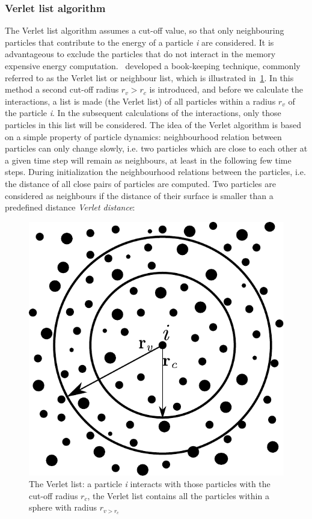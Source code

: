 \subsubsection{Verlet list algorithm}
The Verlet list algorithm assumes a cut-off value, so that only neighbouring 
particles that contribute to the energy of a particle \textit{i} are 
considered. It is advantageous to exclude the particles that do not interact in 
the memory expensive energy computation.~\citet{Verlet1967} 
developed a book-keeping technique, commonly referred to as the Verlet list or 
neighbour list, which is illustrated in~\ref{fig:Verletb}. In this method a 
second cut-off radius $r_{\mathit{v}}>r_{c}$ is introduced, and before we 
calculate the interactions, a list is made (the Verlet list) of all particles 
within a radius $r_{\mathit{v}}$ of the particle \textit{i}. In the 
subsequent calculations of the interactions, only those particles in this list 
will be considered. The idea of the Verlet algorithm is based on a simple 
property of particle dynamics: neighbourhood relation between particles can 
only change slowly, i.e. two particles which are close to each other 
at a given time step will remain as neighbours, at least in the following few 
time steps. During initialization the neighbourhood relations between the 
particles, i.e. the distance of all close 
pairs of particles are computed. Two particles are considered as neighbours if 
the distance of 
their surface is smaller than a predefined distance \textit{Verlet distance}:
\begin{figure}[htbp]	
\centering
\includegraphics[scale=0.75]{Verletb}
\caption[Verlet list]{The Verlet list: a particle \textit{i} interacts with 
those particles with 
the cut-off radius $r_{c}$, the Verlet list contains all the particles within 
a sphere with radius 
$r_{\mathit{v}>r_{c}}$}
\label{fig:Verletb}
\end{figure}
